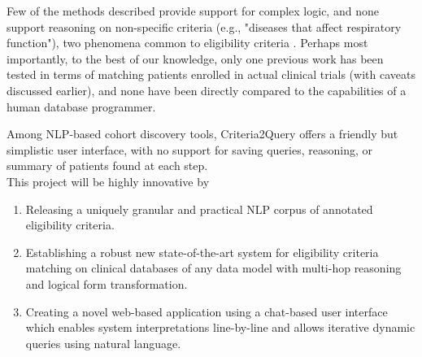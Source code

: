 \documentclass[../main.tex]{subfiles}
\begin{document}
Few of the methods described provide support for complex logic, and none support reasoning on non-specific criteria (e.g., "diseases that affect respiratory function"), two phenomena common to eligibility criteria \cite{wang2017classifying, ross2010analysis}. Perhaps most importantly, to the best of our knowledge, only one previous work has been tested in terms of matching patients enrolled in actual clinical trials \cite{zhang2020deepenroll} (with caveats discussed earlier), and none have been directly compared to the capabilities of a human database programmer. 

Among NLP-based cohort discovery tools, Criteria2Query offers a friendly but simplistic user interface, with no support for saving queries, reasoning, or summary of patients found at each step. \\

\noindent This project will be highly innovative by

\begin{enumerate}
    \itemsep0em 
    \item Releasing a uniquely granular and practical NLP corpus of annotated eligibility criteria.
    \item Establishing a robust new state-of-the-art system for eligibility criteria matching on clinical databases of any data model with multi-hop reasoning and logical form transformation.
    \item Creating a novel web-based application using a chat-based user interface which enables system interpretations line-by-line and allows iterative dynamic queries using natural language.
\end{enumerate}
\end{document}
